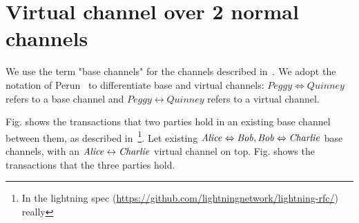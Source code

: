 \section{Virtual channel over 2 normal channels}
  We use the term "base channels" for the channels described
  in~\cite{lightning}. We adopt the notation of
  Perun~\cite{DBLP:conf/ccs/DziembowskiFH18} to differentiate base and virtual
  channels: $\mathit{Peggy} \Leftrightarrow \mathit{Quinney}$ refers to a base
  channel and $\mathit{Peggy} \leftrightarrow \mathit{Quinney}$ refers to a
  virtual channel.

  Fig. shows the transactions that two parties hold in an
  existing base channel between them, as described
  in~\cite{lightning}\footnote{In the lightning spec
  (\url{https://github.com/lightningnetwork/lightning-rfc/}) really}. Let
  existing $\mathit{Alice} \Leftrightarrow \mathit{Bob}, \mathit{Bob} \Leftrightarrow \mathit{Charlie}$ base
  channels, with an $\mathit{Alice} \leftrightarrow \mathit{Charlie}$ virtual channel on top.
  Fig. shows the transactions that the three parties hold.

